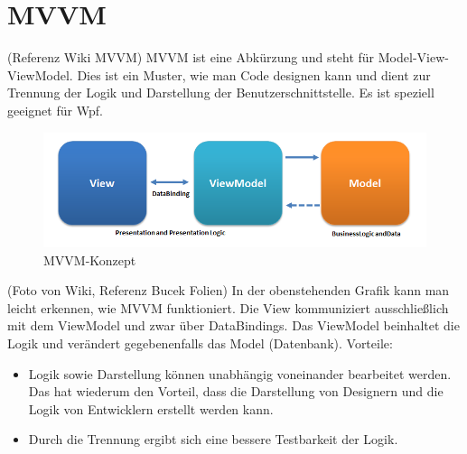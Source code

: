 \section{MVVM}
(Referenz Wiki MVVM) MVVM ist eine Abkürzung und steht für Model-View-ViewModel. Dies ist ein Muster, wie man Code designen kann und dient zur Trennung der Logik und Darstellung der Benutzerschnittstelle. Es ist speziell geeignet für Wpf. 
\begin{figure}[H]
\begin{center}
	\includegraphics[scale=.75]{images/MVVMPattern.png}
\end{center}
	\caption{MVVM-Konzept}
	\label{fig:sample}
\end{figure}
(Foto von Wiki, Referenz Bucek Folien)
In der obenstehenden Grafik kann man leicht erkennen, wie MVVM funktioniert. Die View kommuniziert ausschließlich mit dem ViewModel und zwar über DataBindings. Das ViewModel beinhaltet die Logik und verändert gegebenenfalls das Model (Datenbank). 
\newline
Vorteile:
\begin{itemize}
\item Logik sowie Darstellung können unabhängig voneinander bearbeitet werden. Das hat wiederum den Vorteil, dass die Darstellung von Designern und die Logik von Entwicklern erstellt werden kann.
\item Durch die Trennung ergibt sich eine bessere Testbarkeit der Logik.
\end{itemize}
